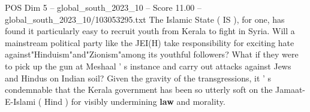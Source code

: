\begin{textsample}{POS Dim 5 – global\_south\_2023\_10 – Score 11.00 – global\_south\_2023\_10/103053295.txt}
The Islamic State ( IS ), for one, has found it particularly easy to recruit youth from Kerala to fight in Syria.
Will a mainstream political party like the JEI(H) take responsibility for exciting hate against"Hinduism"and"Zionism"among its youthful followers?
What if they were to pick up the gun at Meshaal ' s instance and carry out attacks against Jews and Hindus on Indian soil?
Given the gravity of the transgressions, it ' s condemnable that the Kerala government has been so utterly soft on the Jamaat-E-Islami ( Hind ) for visibly undermining \textbf{law} and morality.

\end{textsample}
